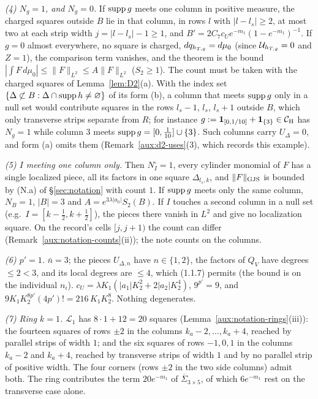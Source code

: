 \emph{(4) $N_g=1$, and $N_g=0$.} If $\operatorname{supp} g$ meets one column in positive measure, the charged
squares outside $B$ lie in that column, in rows $l$ with $|l-l_s|\ge2$, at most two at each
strip width $j=|l-l_s|-1\ge1$, and
$B'=2C_7c_Ue^{-m_1}(1-e^{-m_1})^{-1}$. If $g=0$ almost everywhere, no square is charged,
$dq_{h_{T,g}}=d\mu_0$ (since $\mathcal U_{h_{T,g}}=0$ and $Z=1$), the comparison term vanishes, and the
theorem is the bound $|\int F\,d\mu_0|\le\|F\|_{L^2}\le A\|F\|_{L^2}$ ($S_2\ge1$). The count
must be taken with the charged squares of Lemma~\ref{lem:D2}(a). With the index set
$\{\Delta\not\subset B:\Delta\cap\operatorname{supp} h\ne\varnothing\}$ of its form (b), a column that meets
$\operatorname{supp} g$ only in a null set would contribute squares in the rows $l_s-1$, $l_s$, $l_s+1$
outside $B$, which only transverse strips separate from $R$; for instance
$g:=\mathbf 1_{[0,1/10]}+\mathbf 1_{\{3\}}\in\mathcal{C}_{\mathrm H}$ has $N_g=1$ while column $3$ meets
$\operatorname{supp} g=[0,\frac1{10}]\cup\{3\}$. Such columns carry $U_\Delta=0$, and form (a) omits them
(Remark~\ref{aux:d2-uses}(3), which records this example).

\emph{(5) $I$ meeting one column only.} Then $N^\square_I=1$, every cylinder monomial of $F$ has
a single localized piece, all its factors in one square $\Delta_{l_s,k}$, and
$\lVert F\rVert_{\mathrm{GJS}}$ is bounded by (N.a) of \S\ref{sec:notation} with count $1$. If $\operatorname{supp} g$ meets only the
same column, $N_B=1$, $|B|=3$ and $A=e^{3\lambda|a_0|}S_2(B)$. If $I$ touches a second column in
a null set (e.g.\ $I=[k-\frac12,k+\frac12]$), the pieces there vanish in $L^2$ and give no
localization square. On the record's cells $[j,j+1)$ the count can differ
(Remark~\ref{aux:notation-counts}(ii)); the note counts on the columns.

\emph{(6) $p'=1$.} $\bar n=3$; the pieces $U_{\Delta,n}$ have $n\in\{1,2\}$, the factors of $Q_V$
have degrees $\le2<3$, and its local degrees are $\le4$, which (1.1.7) permits (the bound is on
the individual $n_i$). $c_U=\lambda K_1(|a_1|K_2^2+2|a_2|K_2^4)$, $9^{p'}=9$, and
$9K_1K_2^{8p'}(4p')!=216\,K_1K_2^8$. Nothing degenerates.

\emph{(7) Ring $k=1$.} $\mathcal L_1$ has $8\cdot1+12=20$ squares
(Lemma~\ref{aux:notation-rings}(iii)): the fourteen squares of rows $\pm2$ in the columns
$k_a-2,\dots,k_a+4$, reached by parallel strips of width $1$; and the six squares of rows
$-1,0,1$ in the columns $k_a-2$ and $k_a+4$, reached by transverse strips of width $1$ and by no
parallel strip of positive width. The four corners (rows $\pm2$ in the two side columns) admit
both. The ring contributes the term $20e^{-m_1}$ of $\overline\Sigma_{3\times5}$, of which
$6e^{-m_1}$ rest on the transverse case alone.

